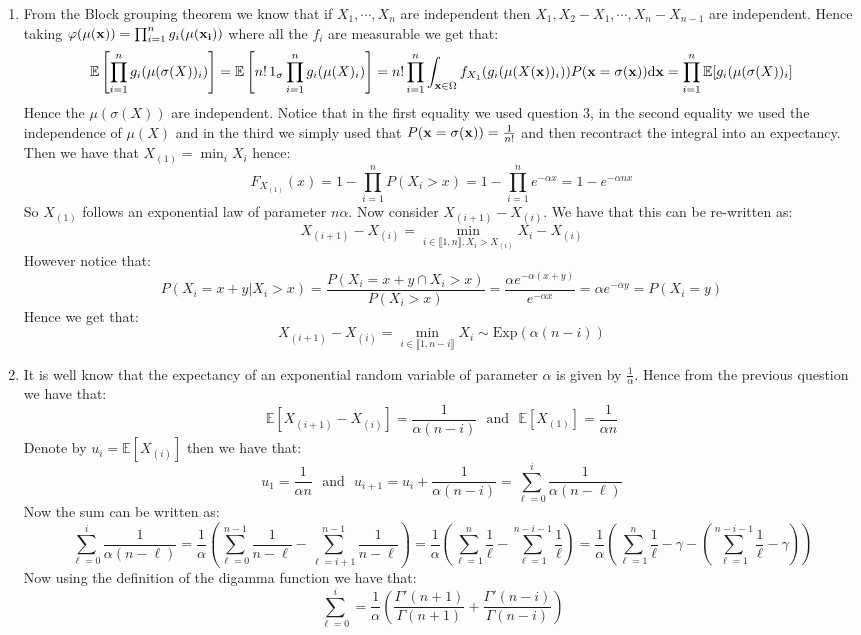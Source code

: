 \documentclass[10pt,a4paper]{article}
\begin{document}
\begin{enumerate}
\item From the Block grouping theorem we know that if $X_1, \cdots, X_n$ are independent then $X_1, X_2 - X_1, \cdots, X_{n} - X_{n-1}$ are independent. Hence taking $\varphi(\mu(\vb{x})) = \prod_{i = 1}^n g_i(\mu(\vb{x_i}))$ where all the $f_i$ are measurable we get that:
\[
\mathbb{E}\left[\prod_{i = 1}^n g_i(\mu(\sigma(X))_i)\right] = \mathbb{E}\left[ n!\, 1_\sigma \prod_{i = 1}^n g_i(\mu(X)_i)\right] = n! \prod_{i = 1}^n \int_{\vb{x} \in \Omega} f_{X_1}(g_i(\mu(X(\vb{x}))_i)) P(\vb{x} = \sigma(\vb{x})) \dd \vb{x} = \prod_{i = 1}^n \mathbb{E}[g_i(\mu(\sigma(X))_i] 
\] 
Hence the $\mu(\sigma(X))$ are independent. Notice that in the first equality we used question 3, in the second equality we used the independence of $\mu(X)$ and in the third we simply used that $P(\vb{x} = \sigma(\vb{x})) = \frac{1}{n!}$ and then recontract the integral into an expectancy.
Then we have that $X_{(1)} = \min_i X_i$ hence:
\[
F_{X_{(1)}}(x) = 1 - \prod_{i = 1}^n P(X_i > x) = 1 - \prod_{i = 1}^n e^{- \alpha x} = 1 - e^{- \alpha n x}
\]
So $X_{(1)}$ follows an exponential law of parameter $n \alpha$. Now consider $X_{(i+1)} - X_{(i)}$. We have that this can be re-written as:
\[
X_{(i+1)} - X_{(i)} = \min_{i \in \llbracket 1, n \rrbracket, X_i > X_{(i)}} X_i - X_{(i)}
\]
However notice that:
\[
P(X_i = x + y | X_i > x) = \frac{P(X_i = x+ y \cap X_i > x)}{P(X_i > x)} = \frac{\alpha e^{-\alpha(x+y)}}{e^{-\alpha x}} = \alpha e^{-\alpha y} = P(X_i = y)
\]
Hence we get that:
\[
X_{(i+1)} - X_{(i)} = \min_{i \in \llbracket 1, n - i\rrbracket} X_i \sim \mbox{Exp}(\alpha(n - i))
\]


\item It is well know that the expectancy of an exponential random variable of parameter $\alpha$ is given by $\frac{1}{\alpha}$. Hence from the previous question we have that:
\[
\mathbb{E}[X_{(i+1)} - X_{(i)}] = \frac{1}{\alpha(n - i)} \mbox{~~and~~} \mathbb{E}[X_{(1)}] = \frac{1}{\alpha n }
\]
Denote by $u_i = \mathbb{E}[X_{(i)}]$ then we have that:
\[
u_1 = \frac{1}{\alpha n} \mbox{~~and~~} u_{i+1} = u_i + \frac{1}{\alpha(n - i)} = \sum_{\ell = 0}^{i} \frac{1}{\alpha(n - \ell)}
\]
Now the sum can be written as:
\[
\sum_{\ell = 0}^i \frac{1}{\alpha(n - \ell)} = \frac{1}{\alpha}\left( \sum_{\ell = 0}^{n-1} \frac{1}{n - \ell} - \sum_{\ell = i + 1}^{n-1} \frac{1}{n - \ell} \right) = \frac{1}{\alpha} \left( \sum_{\ell = 1}^n \frac{1}{\ell} - \sum_{\ell = 1}^{n - i - 1} \frac{1}{\ell} \right) = \frac{1}{\alpha} \left( \sum_{\ell = 1}^n \frac{1}{\ell} - \gamma - (\sum_{\ell = 1}^{n - i - 1} \frac{1}{\ell} - \gamma) \right) 
\]
Now using the definition of the digamma function we have that:
\[
\sum_{\ell = 0}^i = \frac{1}{\alpha}\left( \frac{\Gamma'(n+1)}{\Gamma(n+1)} + \frac{\Gamma'(n-i)}{\Gamma(n-i)} \right)
\]


\end{enumerate}
\end{document}
